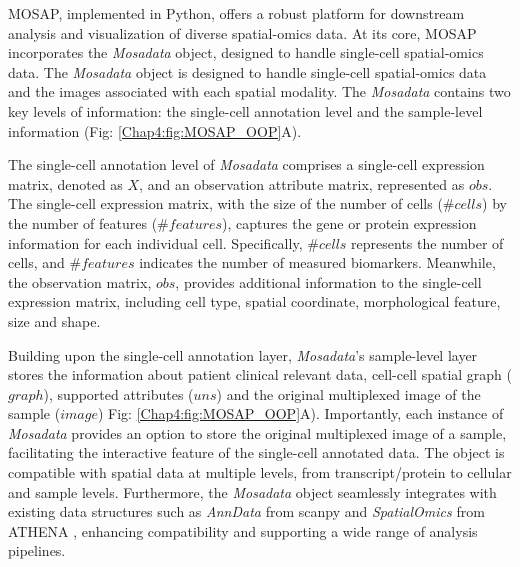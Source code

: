 MOSAP, implemented in Python, offers a robust platform for downstream analysis and visualization of diverse spatial-omics data. At its core, MOSAP incorporates the \textit{Mosadata} object, designed to handle single-cell spatial-omics data.  The \textit{Mosadata} object is designed to handle single-cell spatial-omics data and the images associated with each spatial modality. The \textit{Mosadata} contains two key levels of information: the single-cell annotation level and the sample-level information (Fig: \ref{Chap4:fig:MOSAP_OOP}A). 

The single-cell annotation level of \textit{Mosadata} comprises a single-cell expression matrix, denoted as $X$, and an observation attribute matrix, represented as $obs$. The single-cell expression matrix, with the size of the number of cells ($\#cells$) by the number of features ($\#features$), captures the gene or protein expression information for each individual cell. Specifically, $\#cells$ represents the number of cells, and $\#features$ indicates the number of measured biomarkers. Meanwhile, the observation matrix, $obs$, provides additional information to the single-cell expression matrix, including cell type, spatial coordinate, morphological feature, size and shape. 

Building upon the single-cell annotation layer, \textit{Mosadata}'s sample-level layer stores the information about patient clinical relevant data, cell-cell spatial graph ($graph$), supported attributes ($uns$) and the original multiplexed image of the sample ($image$) Fig: \ref{Chap4:fig:MOSAP_OOP}A). Importantly, each instance of \textit{Mosadata} provides an option to store the original multiplexed image of a sample, facilitating the interactive feature of the single-cell annotated data. The object is compatible with spatial data at multiple levels, from transcript/protein to cellular and sample levels. Furthermore, the \textit{Mosadata} object seamlessly integrates with existing data structures such as \textit{AnnData} from scanpy \cite{wolf2018scanpy} and \textit{SpatialOmics} from ATHENA \cite{martinelli2022athena}, enhancing compatibility and supporting a wide range of analysis pipelines.  

